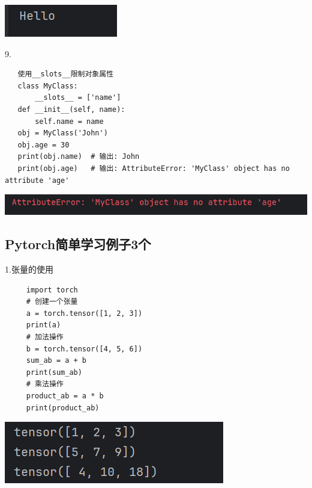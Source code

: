 \documentclass{article}
\begin{document}
\noindent
\begin{minipage}{\linewidth}
 \centering
  \includegraphics[width=0.5\linewidth]{学习16.png}
  \label{fig:example}
\end{minipage}

9.
\begin{verbatim}
   使用__slots__限制对象属性
   class MyClass:
       __slots__ = ['name']
   def __init__(self, name):
       self.name = name
   obj = MyClass('John')
   obj.age = 30  
   print(obj.name)  # 输出: John
   print(obj.age)   # 输出: AttributeError: 'MyClass' object has no attribute 'age'
\end{verbatim}

\noindent
\begin{minipage}{\linewidth}
 \centering
  \includegraphics[width=0.5\linewidth]{学习17.png}
  \label{fig:example}
\end{minipage}


\subsection{Pytorch简单学习例子3个}
1.张量的使用 
\begin{verbatim}
     import torch
     # 创建一个张量
     a = torch.tensor([1, 2, 3])
     print(a)
     # 加法操作
     b = torch.tensor([4, 5, 6])
     sum_ab = a + b
     print(sum_ab)
     # 乘法操作
     product_ab = a * b
     print(product_ab)
\end{verbatim}


\begin{minipage}{\linewidth}
    \centering
     \includegraphics[width=0.5\linewidth]{学习18.png}
     \label{fig:example}
\end{minipage}
\end{document}

